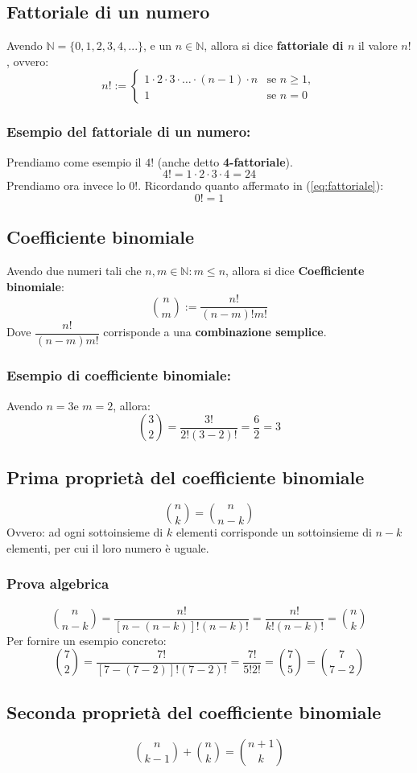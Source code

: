 \documentclass[12pt]{article}
\begin{document}
\subsection{Fattoriale di un numero}
Avendo $\mathbb{N} = \{0, 1, 2, 3, 4, ...\}$, e un $n \in \mathbb{N}$, allora si dice \textbf{fattoriale di $n$} il valore $n!$, ovvero:
\begin{equation}
    n! := 
    \begin{cases} 
        1 \cdot 2 \cdot 3 \cdot \dots \cdot (n-1) \cdot n & \text{se } n \geq 1, \\
        1 & \text{se } n = 0 
        \label{eq:fattoriale}
    \end{cases}
\end{equation}
\subsubsection{Esempio del fattoriale di un numero:}
Prendiamo come esempio il $4!$ (anche detto \textbf{4-fattoriale}).
\[4! = 1 \cdot 2 \cdot 3 \cdot 4 = 24\]
Prendiamo ora invece lo $0!$. Ricordando quanto affermato in (\ref{eq:fattoriale}):
\[0! = 1\]
\subsection{Coefficiente binomiale}
Avendo due numeri tali che $n, m \in \mathbb{N} : m \leq n$, allora si dice \textbf{Coefficiente binomiale}:
\begin{equation}
    \binom{n}{m} := \dfrac{n!}{(n-m)!m!} \label{eq:coefficiente_binomiale}
\end{equation}
Dove $\dfrac{n!}{(n-m)m!}$ corrisponde a una \textbf{combinazione semplice}.
\subsubsection{Esempio di coefficiente binomiale:}
Avendo $n=3 \text{e } m=2$, allora:
\[
    \binom{3}{2} = \dfrac{3!}{2!(3-2)!} = \dfrac{6}{2} = 3
\]
\pagebreak
\subsection{Prima proprietà del coefficiente binomiale}
\begin{equation}
    \binom{n}{k} = \binom{n}{n-k} \label{prop1_coeff_binomiale}
\end{equation}
Ovvero: ad ogni sottoinsieme di $k$ elementi corrisponde un sottoinsieme di $n-k$ elementi, per cui il loro numero è uguale.
\subsubsection{Prova algebrica}
\[
    \binom{n}{n-k} = \dfrac{n!}{[n-(n-k)]!(n-k)!} = \dfrac{n!}{k!(n-k)!} = \binom{n}{k}
\]
Per fornire un esempio concreto:
\[
    \binom{7}{2} = \dfrac{7!}{[7 - (7 - 2)]!(7-2)!} = \dfrac{7!}{5!2!} = \binom{7}{5} = \binom{7}{7-2}
\]
\subsection{Seconda proprietà del coefficiente binomiale}
\begin{equation}
    \binom{n}{k-1} + \binom{n}{k} = \binom{n+1}{k} \label{prop2_coeff_binomiale}
\end{equation}
\end{document}

